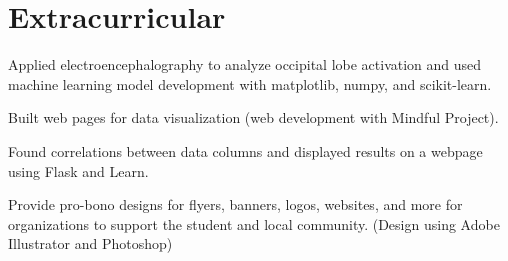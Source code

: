 \documentclass[]{deedy-resume-openfont}
\begin{document}
\begin{minipage}[t]{0.66\textwidth}

\section{Extracurricular}
\begin{tightemize}
\item Applied electroencephalography to analyze occipital lobe activation and used machine learning model development with matplotlib, numpy, and scikit-learn.
\item Built web pages for data visualization (web development with Mindful Project).
\item Found correlations between data columns and displayed results on a webpage using Flask and Learn.
\end{tightemize}
\sectionsep

\begin{tightemize}
\item Provide pro-bono designs for flyers, banners, logos, websites, and more for organizations to support the student and local community. (Design using Adobe Illustrator and Photoshop)
\end{tightemize}
\sectionsep

\end{minipage} 
\end{document}
